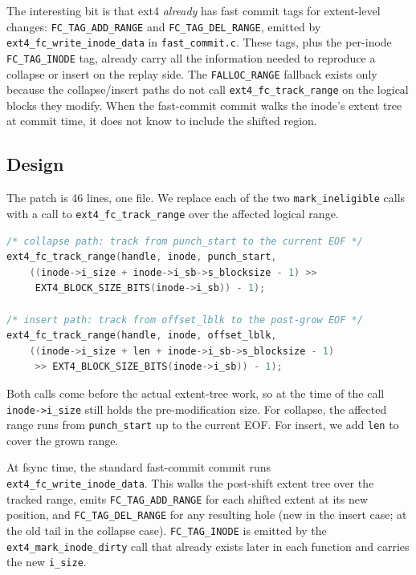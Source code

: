 \documentclass[11pt,a4paper]{article}
\begin{document}
The interesting bit is that ext4 \emph{already} has fast commit tags
for extent-level changes: \texttt{FC\_TAG\_ADD\_RANGE} and
\texttt{FC\_TAG\_DEL\_RANGE}, emitted by
\texttt{ext4\_fc\_write\_inode\_data} in \texttt{fast\_commit.c}.
These tags, plus the per-inode \texttt{FC\_TAG\_INODE} tag, already
carry all the information needed to reproduce a collapse or insert
on the replay side. The \texttt{FALLOC\_RANGE} fallback exists only
because the collapse/insert paths do not call
\texttt{ext4\_fc\_track\_range} on the logical blocks they modify.
When the fast-commit commit walks the inode's extent tree at
commit time, it does not know to include the shifted region.

\subsection{Design}

The patch is 46 lines, one file. We replace each of the two
\texttt{mark\_ineligible} calls with a call to
\texttt{ext4\_fc\_track\_range} over the affected logical range.

\begin{lstlisting}[language=C]
/* collapse path: track from punch_start to the current EOF */
ext4_fc_track_range(handle, inode, punch_start,
    ((inode->i_size + inode->i_sb->s_blocksize - 1) >>
     EXT4_BLOCK_SIZE_BITS(inode->i_sb)) - 1);

/* insert path: track from offset_lblk to the post-grow EOF */
ext4_fc_track_range(handle, inode, offset_lblk,
    ((inode->i_size + len + inode->i_sb->s_blocksize - 1)
     >> EXT4_BLOCK_SIZE_BITS(inode->i_sb)) - 1);
\end{lstlisting}

Both calls come before the actual extent-tree work, so at the time
of the call \texttt{inode->i\_size} still holds the pre-modification
size. For collapse, the affected range runs from \texttt{punch\_start}
up to the current EOF. For insert, we add \texttt{len} to cover the
grown range.

At fsync time, the standard fast-commit commit runs
\texttt{ext4\_fc\_write\_inode\_data}. This walks the post-shift
extent tree over the tracked range, emits
\texttt{FC\_TAG\_ADD\_RANGE} for each shifted extent at its new
position, and \texttt{FC\_TAG\_DEL\_RANGE} for any resulting hole
(new in the insert case; at the old tail in the collapse case).
\texttt{FC\_TAG\_INODE} is emitted by the
\texttt{ext4\_mark\_inode\_dirty} call that already exists later in
each function and carries the new \texttt{i\_size}.
\end{document}

